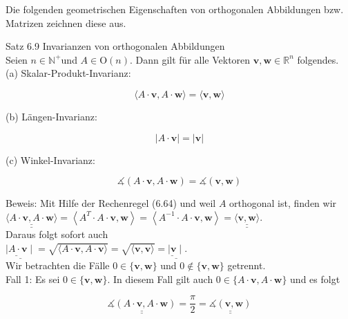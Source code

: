 \documentclass[10pt]{article}
\begin{document}
Die folgenden geometrischen Eigenschaften von orthogonalen Abbildungen bzw. Matrizen zeichnen diese aus.

Satz 6.9 Invarianzen von orthogonalen Abbildungen\\
Seien $n \in \mathbb{N}^{+}$und $A \in \mathrm{O}(n)$. Dann gilt für alle Vektoren $\mathbf{v}, \mathbf{w} \in \mathbb{R}^{n}$ folgendes.\\
(a) Skalar-Produkt-Invarianz:


\begin{equation*}
\langle A \cdot \mathbf{v}, A \cdot \mathbf{w}\rangle=\langle\mathbf{v}, \mathbf{w}\rangle \tag{6.67}
\end{equation*}


(b) Längen-Invarianz:


\begin{equation*}
|A \cdot \mathbf{v}|=|\mathbf{v}| \tag{6.68}
\end{equation*}


(c) Winkel-Invarianz:


\begin{equation*}
\measuredangle(A \cdot \mathbf{v}, A \cdot \mathbf{w})=\measuredangle(\mathbf{v}, \mathbf{w}) \tag{6.69}
\end{equation*}


Beweis: Mit Hilfe der Rechenregel (6.64) und weil $A$ orthogonal ist, finden wir\\
$\underline{\underline{\langle A \cdot \mathbf{v}, A \cdot \mathbf{w}\rangle}}=\left\langle A^{T} \cdot A \cdot \mathbf{v}, \mathbf{w}\right\rangle=\left\langle A^{-1} \cdot A \cdot \mathbf{v}, \mathbf{w}\right\rangle=\underline{\underline{\langle\mathbf{v}, \mathbf{w}\rangle}}$.\\
Daraus folgt sofort auch\\
$\underline{\underline{\mid A \cdot \mathbf{v}} \mid}=\sqrt{\langle A \cdot \mathbf{v}, A \cdot \mathbf{v}\rangle}=\sqrt{\langle\mathbf{v}, \mathbf{v}\rangle}=\underline{\underline{\mid \mathbf{v}} \mid}$.\\
Wir betrachten die Fälle $0 \in\{\mathbf{v}, \mathbf{w}\}$ und $0 \notin\{\mathbf{v}, \mathbf{w}\}$ getrennt.\\
Fall 1: Es sei $0 \in\{\mathbf{v}, \mathbf{w}\}$. In diesem Fall gilt auch $0 \in\{A \cdot \mathbf{v}, A \cdot \mathbf{w}\}$ und es folgt


\begin{equation*}
\underline{\underline{\measuredangle(A \cdot \mathbf{v}, A \cdot \mathbf{w})}}=\frac{\pi}{2}=\underline{\underline{\measuredangle(\mathbf{v}, \mathbf{w})}} \tag{6.72}
\end{equation*}
\end{document}

